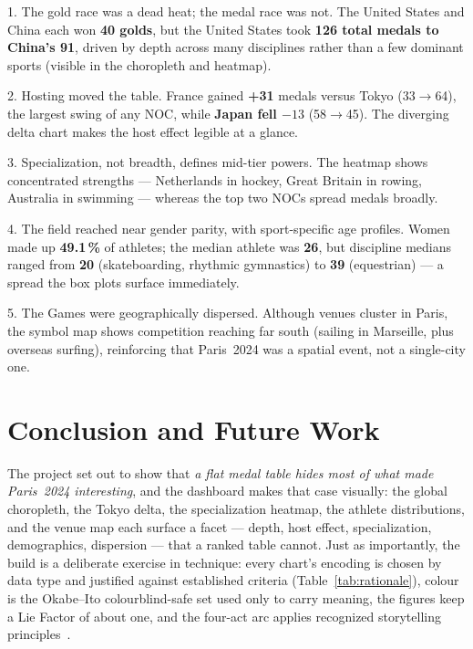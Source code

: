 \documentclass[11pt]{article}
\begin{document}
\begin{insightbox}{1. The gold race was a dead heat; the medal race was not.}
The United States and China each won \textbf{40 golds}, but the United States
took \textbf{126 total medals to China's 91}, driven by depth across many
disciplines rather than a few dominant sports (visible in the choropleth and
heatmap).
\end{insightbox}
\begin{insightbox}{2. Hosting moved the table.}
France gained \textbf{+31} medals versus Tokyo (33$\rightarrow$64), the largest
swing of any NOC, while \textbf{Japan fell $-13$} (58$\rightarrow$45). The
diverging delta chart makes the host effect legible at a glance.
\end{insightbox}
\begin{insightbox}{3. Specialization, not breadth, defines mid-tier powers.}
The heatmap shows concentrated strengths --- Netherlands in hockey, Great Britain
in rowing, Australia in swimming --- whereas the top two NOCs spread medals
broadly.
\end{insightbox}
\begin{insightbox}{4. The field reached near gender parity, with sport-specific age profiles.}
Women made up \textbf{49.1\,\%} of athletes; the median athlete was \textbf{26},
but discipline medians ranged from \textbf{20} (skateboarding, rhythmic
gymnastics) to \textbf{39} (equestrian) --- a spread the box plots surface
immediately.
\end{insightbox}
\begin{insightbox}{5. The Games were geographically dispersed.}
Although venues cluster in Paris, the symbol map shows competition reaching far
south (sailing in Marseille, plus overseas surfing), reinforcing that Paris~2024
was a spatial event, not a single-city one.
\end{insightbox}

\section{Conclusion and Future Work}
\label{sec:conclusion}

The project set out to show that \emph{a flat medal table hides most of what made
Paris~2024 interesting}, and the dashboard makes that case visually: the global
choropleth, the Tokyo delta, the specialization heatmap, the athlete
distributions, and the venue map each surface a facet --- depth, host effect,
specialization, demographics, dispersion --- that a ranked table cannot. Just as
importantly, the build is a deliberate exercise in technique: every chart's
encoding is chosen by data type and justified against established criteria
(Table~\ref{tab:rationale}), colour is the Okabe--Ito colourblind-safe set used
only to carry meaning, the figures keep a Lie Factor of about one, and the
four-act arc applies recognized storytelling principles~\cite{knaflic2015}.
\end{document}
